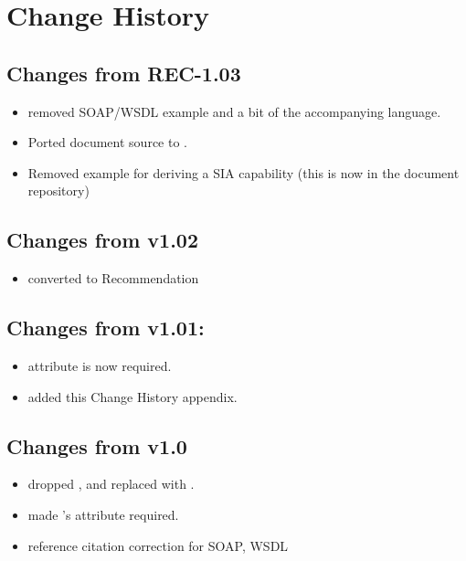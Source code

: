 \documentclass[11pt,a4paper]{ivoa}
\begin{document}
\appendix

\section{Change History}

\subsection{Changes from REC-1.03}

\begin{itemize}
\item removed SOAP/WSDL example and a bit of the accompanying language.
\item Ported document source to \ivoatex.
\item Removed example for deriving a SIA capability (this is now
in the document repository)
\end{itemize}

\subsection{Changes from v1.02}
\begin{itemize}
  \item converted to Recommendation
\end{itemize}

\subsection{Changes from v1.01:}
\begin{itemize}
  \item {} attribute is now required.
  \item added this Change History appendix.
\end{itemize}

\subsection{Changes from v1.0}
\begin{itemize}
  \item dropped ,  and replaced
       with .
  \item made 's  attribute
       required.
  \item reference citation correction for SOAP, WSDL
\end{itemize}




\end{document}
